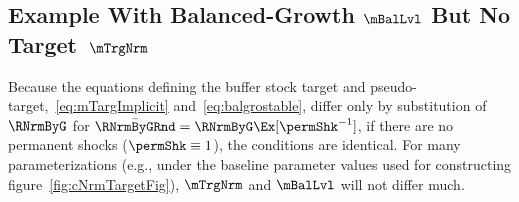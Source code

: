 \documentclass[\econtexRoot/BufferStockTheory]{subfiles}
\begin{document}

\subsection{Example With Balanced-Growth \texorpdfstring{$\mBalLvl$}{m} But No Target~\texorpdfstring{$\mTrgNrm$}{m}}

Because the equations defining the buffer stock target and pseudo-target,~\eqref{eq:mTargImplicit} and~\eqref{eq:balgrostable}, differ only by substitution of $\RNrmByG$ for $\bar{\RNrmByGRnd}=\RNrmByG \Ex[\permShk^{-1}]$, if there are no permanent shocks ($\permShk \equiv 1$), the conditions are identical.
For many parameterizations (e.g., under the baseline parameter values used for constructing figure~\ref{fig:cNrmTargetFig}), $\mTrgNrm$ and $\mBalLvl$ will not differ much.
\end{document}
